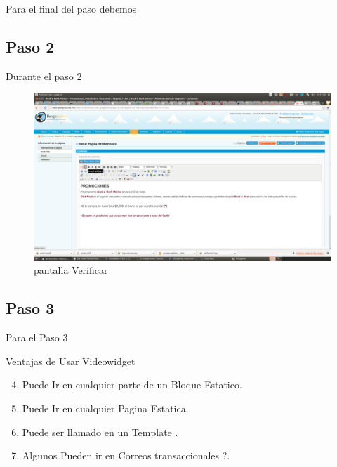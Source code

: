\documentclass[12pt, letterpaper]{article}
\begin{document}
Para el final del paso debemos

\subsection{Paso 2}

{\centering
Durante el paso 2

\begin{figure}[htp]
\centering
\includegraphics[width=16cm]{widget001}
\caption{pantalla Verificar}
\label{fig:flat}
\end{figure}

\subsection{Paso 3}

Para el Paso 3 

Ventajas de Usar Videowidget

}



\begin{enumerate}
\setcounter{enumi}{3}
\item Puede Ir en cualquier parte de un Bloque Estatico.
\item Puede Ir en cualquier Pagina Estatica.
\item Puede ser llamado en un Template \cite{magento}.
\item Algunos Pueden ir en Correos transaccionales ?.
\end{enumerate}
\end{document}

